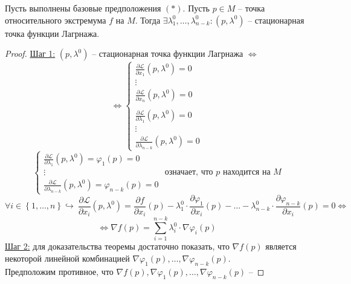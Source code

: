 \documentclass[11pt]{article}
\begin{document}
\begin{theorem}
    Пусть выполнены базовые предположения $(\ast)$. Пусть $p \in M$ -- точка относительного экстремума $f$ на $M$.
    Тогда $\exists \lambda_1^0, \dots, \lambda_{n-k}^0: (p, \lambda^0)$ -- стационарная точка 
    функции Лагрнажа.
\end{theorem}

\begin{proof}\hfill\break
    \underline{Шаг 1:} $(p, \lambda^0)$ -- стационарная точка функции Лагрнажа $\Longleftrightarrow$
    \[\Longleftrightarrow \left\{\begin{array}{c}
       \displaystyle \frac{\partial \mathcal{L}}{\partial x_1}(p, \lambda^0) = 0 \\ \vdots \\  
       \displaystyle \frac{\partial \mathcal{L}}{\partial x_n}(p, \lambda^0) = 0 \\ \\
       \displaystyle \frac{\partial \mathcal{L}}{\partial \lambda_1}(p, \lambda^0) = 0 \\ \vdots \\
       \displaystyle \frac{\partial \mathcal{L}}{\partial \lambda_{n-k}}(p, \lambda^0) = 0
    \end{array}\right.\]
    \[\left\{\begin{array}{c}
       \displaystyle \frac{\partial \mathcal{L}}{\partial \lambda_1} (p, \lambda^0) = \varphi_1 (p) = 0 \\ \vdots \\
       \displaystyle \frac{\partial \mathcal{L}}{\partial \lambda_{n-k}} (p, \lambda^0) = \varphi_{n-k} (p) = 0
    \end{array}\right. \text{ означает, что  } p \text{ находится на } M\]
    \[ \forall i \in \left\{1, \dots, n\right\} \hookrightarrow \ \frac{\partial \mathcal{L}}{\partial x_i}(p, \lambda^0) =
    \frac{\partial f}{\partial x_i}(p) - \lambda_1^0 \cdot \frac{\partial \varphi_1}{\partial x_i}
    (p) - \dotsc - \lambda_{n-k}^0 \cdot \frac{\partial \varphi_{n-k}}{\partial x_i}
    (p) = 0 \Longleftrightarrow\]
    \[\Longleftrightarrow \nabla f(p) = \sum_{i = 1}^{n-k}\lambda_i^0 \cdot \nabla \varphi_i(p)\]
    \underline{Шаг 2:} для доказательства теоремы достаточно показать, что $\nabla f (p)$
    является некоторой линейной комбинацией $\nabla \varphi_1(p), \dots, \nabla \varphi_{n-k}(p)$.\\
    Предположим противное, что $\nabla f(p), \nabla \varphi_1(p), \dots, \nabla \varphi_{n-k}(p)$ --

\end{proof}
\end{document}
